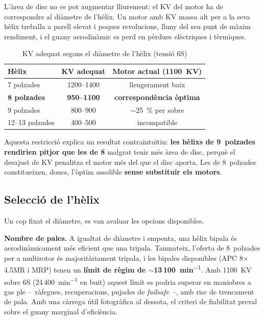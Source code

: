 L'àrea de disc no es pot augmentar lliurement: el KV del motor ha de correspondre al diàmetre de l'hèlix. Un motor amb KV massa alt per a la seva hèlix treballa a parell elevat i poques revolucions, lluny del seu punt de màxim rendiment, i el guany aerodinàmic es perd en pèrdues elèctriques i tèrmiques.

\begin{table}[H]
    \centering
    \caption{KV adequat segons el diàmetre de l'hèlix (tensió 6S)}
    \label{tab:kv-compatibilitat}
    \begin{tabular}{lcc}
        \toprule
        Hèlix & KV adequat & Motor actual (1100~KV) \\
        \midrule
        7 polzades & 1200--1400 & lleugerament baix \\
        \textbf{8 polzades} & \textbf{950--1100} & \textbf{correspondència òptima} \\
        9 polzades & 800--900 & $\sim$25~\% per sobre \\
        12--13 polzades & 400--500 & incompatible \\
        \bottomrule
    \end{tabular}
\end{table}

Aquesta restricció explica un resultat contraintuïtiu: \textbf{les hèlixs de 9~polzades rendirien pitjor que les de 8} malgrat tenir més àrea de disc, perquè el desajust de KV penalitza el motor més del que el disc aporta. Les de 8~polzades constitueixen, doncs, l'òptim assolible \textbf{sense substituir els motors}.

\subsection{Selecció de l'hèlix}
\label{subsec:propulsor-seleccio}

Un cop fixat el diàmetre, es van avaluar les opcions disponibles.

\textbf{Nombre de pales.} A igualtat de diàmetre i empenta, una hèlix bipala és aerodinàmicament més eficient que una tripala. Tanmateix, l'oferta de 8~polzades per a multirotor és majoritàriament tripala, i les bipales disponibles (APC 8$\times$4.5MR i MRP) tenen un \textbf{límit de règim de $\sim$13\,100~min\textsuperscript{$-1$}}. Amb 1100~KV sobre 6S (24\,400~min\textsuperscript{$-1$} en buit) aquest límit es podria superar en maniobres a gas ple --~ràfegues, recuperacions, pujades de \emph{failsafe}~--, amb risc de trencament de pala. Amb una càrrega útil fotogràfica al dessota, el criteri de fiabilitat preval sobre el guany marginal d'eficiència.

